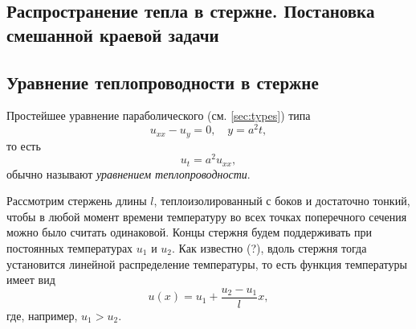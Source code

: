 \subsection{Распространение тепла в стержне. Постановка смешанной краевой задачи}
\subsection*{Уравнение теплопроводности в стержне}
Простейшее уравнение параболического (см. \ref{sec:types}) типа 
\begin{equation}
  \label{eq:teplo_eq}
  u_{xx} - u_y = 0, \quad y = a^2t,
\end{equation}
то есть 
\[
  u_t = a^2u_{xx},
\]
обычно называют \emph{уравнением теплопроводности}.

Рассмотрим стержень длины $ l $, теплоизолированный с боков и 
достаточно тонкий, чтобы в любой момент времени температуру во всех 
точках поперечного сечения можно было считать одинаковой. Концы стержня будем
поддерживать при постоянных температурах $ u_1 $ и $ u_2 $. Как известно (?),
вдоль стержня тогда установится линейной распределение температуры, то есть
функция температуры имеет вид
\[
  u(x) = u_1 + \frac{u_2 - u_1}{l}x,
\]
где, например, $ u_1 > u_2 $.


